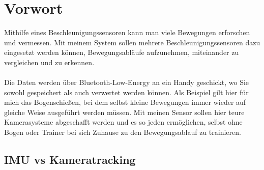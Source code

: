 \chapter[Vorwort]{Vorwort}

Mithilfe eines Beschleunigungssensoren kann man viele 
Bewegungen erforschen und vermessen.
Mit meinem System sollen mehrere Beschleunigungssensoren 
dazu eingesetzt werden können, Bewegungsabläufe aufzunehmen, 
miteinander zu vergleichen und zu erkennen.\\
\\
Die Daten werden über Bluetooth-Low-Energy an ein Handy 
geschickt, wo Sie sowohl gespeichert als auch verwertet 
werden können. Als Beispiel gilt hier für mich das Bogenschießen, 
bei dem selbst kleine Bewegungen immer wieder auf gleiche Weise 
ausgeführt werden müssen. Mit meinen Sensor sollen hier teure 
Kamerasysteme abgeschafft werden und es so jeden ermöglichen, 
selbst ohne Bogen oder Trainer bei sich Zuhause zu den 
Bewegungsablauf zu trainieren.\\

\section{IMU vs Kameratracking}


